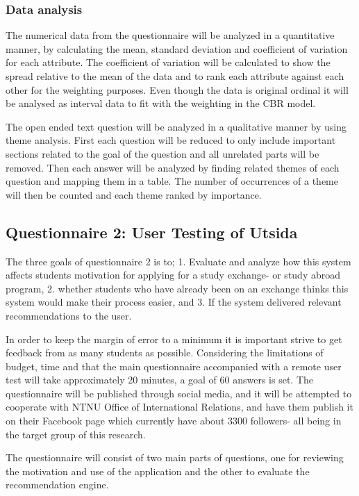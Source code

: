 \subsubsection{Data analysis}
The numerical data from the questionnaire will be analyzed in a quantitative manner, by calculating the mean, standard deviation and coefficient of variation for each attribute. The coefficient of variation will be calculated to show the spread relative to the mean of the data and to rank each attribute against each other for the weighting purposes. Even though the data is original ordinal it will be analysed as interval data to fit with the weighting in the CBR model. 

The open ended text question will be analyzed in a qualitative manner by using theme analysis. First each question will be reduced to only include important sections related to the goal of the question and all unrelated parts will be removed. Then each answer will be analyzed by finding related themes of each question and mapping them in a table. The number of occurrences of a theme will then be counted and each theme ranked by importance. 

\subsection{Questionnaire 2: User Testing of Utsida}\label{sec:questionnaire_2}

The three goals of questionnaire 2 is to; 1. Evaluate and analyze how this system affects students motivation for applying for a study exchange- or study abroad program, 2. whether students who have already been on an exchange thinks this system would make their process easier, and 3. If the system delivered relevant recommendations to the user.

In order to keep the margin of error to a minimum it is important strive to get feedback from as many students as possible. Considering the limitations of budget, time and that the main questionnaire accompanied with a remote user test will take approximately 20 minutes, a goal of 60 answers is set. The questionnaire will be published through social media, and it will be attempted to cooperate with NTNU Office of International Relations, and have them publish it on their Facebook page which currently have about 3300 followers- all being in the target group of this research.

The questionnaire will consist of two main parts of questions, one for reviewing the motivation and use of the application and the other to evaluate the recommendation engine.

